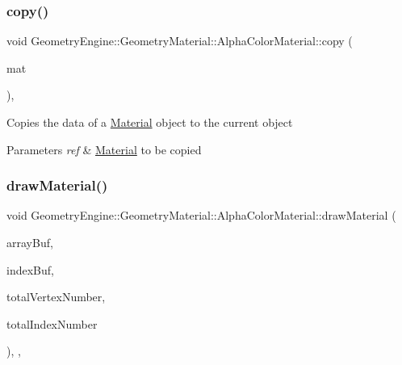 \subsubsection{\texorpdfstring{copy()}{copy()}}
{\footnotesize\ttfamily void Geometry\+Engine\+::\+Geometry\+Material\+::\+Alpha\+Color\+Material\+::copy (\begin{DoxyParamCaption}\item[{const \mbox{\hyperlink{class_geometry_engine_1_1_geometry_material_1_1_alpha_color_material}{Alpha\+Color\+Material}} \&}]{mat }\end{DoxyParamCaption})\hspace{0.3cm}{\ttfamily [protected]}, {\ttfamily [virtual]}}

Copies the data of a \mbox{\hyperlink{class_geometry_engine_1_1_geometry_material_1_1_material}{Material}} object to the current object 
\begin{DoxyParams}{Parameters}
{\em ref} & \mbox{\hyperlink{class_geometry_engine_1_1_geometry_material_1_1_material}{Material}} to be copied \\
\hline
\end{DoxyParams}
\mbox{\label{class_geometry_engine_1_1_geometry_material_1_1_alpha_color_material_a2c0f093001db90b50e42b0520c48f7d1}} 
\subsubsection{\texorpdfstring{drawMaterial()}{drawMaterial()}}
{\footnotesize\ttfamily void Geometry\+Engine\+::\+Geometry\+Material\+::\+Alpha\+Color\+Material\+::draw\+Material (\begin{DoxyParamCaption}\item[{Q\+Open\+G\+L\+Buffer $\ast$}]{array\+Buf,  }\item[{Q\+Open\+G\+L\+Buffer $\ast$}]{index\+Buf,  }\item[{unsigned int}]{total\+Vertex\+Number,  }\item[{unsigned int}]{total\+Index\+Number }\end{DoxyParamCaption})\hspace{0.3cm}{\ttfamily [override]}, {\ttfamily [protected]}, {\ttfamily [virtual]}}

